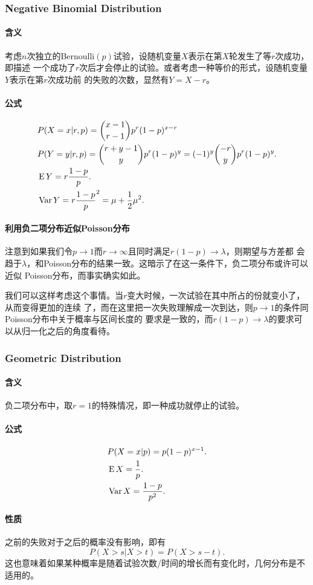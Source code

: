   \subsubsection{Negative Binomial Distribution}
    \paragraph{含义}
    考虑$n$次独立的Bernoulli$(p)$试验，设随机变量$X$表示在第$X$轮发生了等$r$次成功，即描述
    一个成功了$r$次后才会停止的试验。或者考虑一种等价的形式，设随机变量$Y$表示在第$r$次成功前
    的失败的次数，显然有$Y=X-r$。
    
    \paragraph{公式}
    \begin{align*}
      &P(X=x|r,p) = \binom{x-1}{r-1}p^r(1-p)^{x-r} \\
      &P(Y=y|r,p) = \binom{r+y-1}{y}p^r(1-p)^y = (-1)^y\binom{-r}{y}p^r(1-p)^y.\\
      &\operatorname{E} Y = r\frac{1-p}{p}. \\
      &\operatorname{Var} Y = r\frac{1-p}p^2 = \mu+\frac{1}{2}\mu^2.
    \end{align*}

    \paragraph{利用负二项分布近似Poisson分布}
    注意到如果我们令$p\to 1$而$r\to\infty$且同时满足$r(1-p)\to\lambda$，则期望与方差都
    会趋于$\lambda$，和Poisson分布的结果一致。这暗示了在这一条件下，负二项分布或许可以近似
    Poisson分布，而事实确实如此。\par
    我们可以这样考虑这个事情。当$r$变大时候，一次试验在其中所占的份就变小了，从而变得更加的连续
    了，而在这里把一次失败理解成一次到达，则$p\to 1$的条件同Poisson分布中关于概率与区间长度的
    要求是一致的，而$r(1-p)\to\lambda$的要求可以从归一化之后的角度看待。
  \subsubsection{Geometric Distribution}
    \paragraph{含义}
    负二项分布中，取$r=1$的特殊情况，即一种成功就停止的试验。

    \paragraph{公式}
    \begin{align*}
      &P(X=x|p) = p(1-p)^{x-1}. \\
      &\operatorname{E} X = \frac{1}{p}. \\
      &\operatorname{Var} X = \frac{1-p}{p^2}. 
    \end{align*}

    \paragraph{性质}
    之前的失败对于之后的概率没有影响，即有
    \[
      P(X>s|X>t) = P(X>s-t).
    \]
    这也意味着如果某种概率是随着试验次数/时间的增长而有变化时，几何分布是不适用的。


